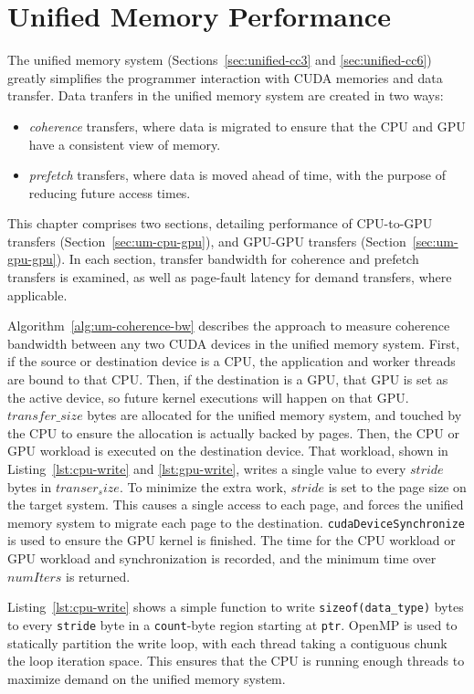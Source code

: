\chapter{Unified Memory Performance}
\label{ch:unified}

The unified memory system (Sections~\ref{sec:unified-cc3} and \ref{sec:unified-cc6}) greatly simplifies the programmer interaction with CUDA memories and data transfer.
Data tranfers in the unified memory system are created in two ways:
\begin{itemize}
	\item \textit{coherence} transfers, where data is migrated to ensure that the CPU and GPU have a consistent view of memory.
	\item \textit{prefetch} transfers, where data is moved ahead of time, with the purpose of reducing future access times. 
\end{itemize}
This chapter comprises two sections, detailing performance of CPU-to-GPU transfers (Section~\ref{sec:um-cpu-gpu}), and GPU-GPU transfers (Section~\ref{sec:um-gpu-gpu}).
In each section, transfer bandwidth for coherence and prefetch transfers is examined, as well as page-fault latency for demand transfers, where applicable.

Algorithm~\ref{alg:um-coherence-bw} describes the approach to measure coherence bandwidth between any two CUDA devices in the unified memory system.
First, if the source or destination device is a CPU, the application and worker threads are bound to that CPU.
Then, if the destination is a GPU, that GPU is set as the active device, so future kernel executions will happen on that GPU.
$transfer\_size$ bytes are allocated for the unified memory system, and touched by the CPU to ensure the allocation is actually backed by pages.
Then, the CPU or GPU workload is executed on the destination device.
That workload, shown in Listing~\ref{lst:cpu-write} and \ref{lst:gpu-write}, writes a single value to every $stride$ bytes in $transer_size$.
To minimize the extra work, $stride$ is set to the page size on the target system.
This causes a single access to each page, and forces the unified memory system to migrate each page to the destination.
\texttt{cudaDeviceSynchronize} is used to ensure the GPU kernel is finished.
The time for the CPU workload or GPU workload and synchronization is recorded, and the minimum time over $numIters$ is returned.

Listing~\ref{lst:cpu-write} shows a simple function to write \texttt{sizeof(data\_type)} bytes to every \texttt{stride} byte in a \texttt{count}-byte region starting at \texttt{ptr}.
OpenMP is used to statically partition the write loop, with each thread taking a contiguous chunk the loop iteration space.
This ensures that the CPU is running enough threads to maximize demand on the unified memory system.

